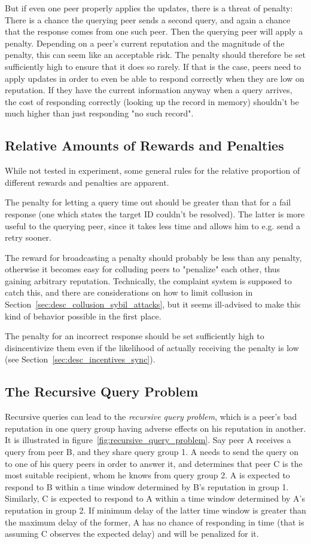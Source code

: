 But if even one peer properly applies the updates, there is a threat of penalty:
There is a chance the querying peer sends a second query, and again a chance
that the response comes from one such peer. Then the querying peer will apply a
penalty. Depending on a peer's current reputation and the magnitude of the
penalty, this can seem like an acceptable risk. The penalty should therefore be
set sufficiently high to ensure that it does so rarely. If that is the case,
peers need to apply updates in order to even be able to respond correctly when
they are low on reputation. If they have the current information anyway when a
query arrives, the cost of responding correctly (looking up the record in
memory) shouldn't be much higher than just responding "no such record".

\subsection{Relative Amounts of Rewards and Penalties}
While not tested in experiment, some general rules for the relative proportion
of different rewards and penalties are apparent.

The penalty for letting a query time out should be greater than that for a fail
response (one which states the target ID couldn't be resolved). The latter is
more useful to the querying peer, since it takes less time and allows him to
e.g. send a retry sooner.

The reward for broadcasting a penalty should probably be less than any penalty,
otherwise it becomes easy for colluding peers to "penalize" each other, thus
gaining arbitrary reputation. Technically, the complaint system is supposed to
catch this, and there are considerations on how to limit collusion in
Section~\ref{sec:desc_collusion_sybil_attacks}, but it seems ill-advised to make
this kind of behavior possible in the first place.

The penalty for an incorrect response should be set sufficiently high to
disincentivize them even if the likelihood of actually receiving the penalty is
low (see Section~\ref{sec:desc_incentives_sync}).

\subsection{The Recursive Query Problem}
\label{sec:desc_rec_query_prob}
Recursive queries can lead to the \emph{recursive query problem}, which is a
peer's bad reputation in one query group having adverse effects on his
reputation in another. It is illustrated in
figure~\ref{fig:recursive_query_problem}. Say peer A receives a query from peer
B, and they share query group 1. A needs to send the query on to one of his
query peers in order to answer it, and determines that peer C is the most
suitable recipient, whom he knows from query group 2. A is expected to respond
to B within a time window determined by B's reputation in group 1. Similarly, C
is expected to respond to A within a time window determined by A's reputation in
group 2. If minimum delay of the latter time window is greater than the maximum
delay of the former, A has no chance of responding in time (that is assuming C
observes the expected delay) and will be penalized for it.


